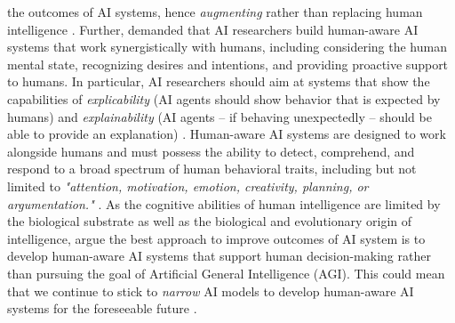 the outcomes of AI systems,  hence \textit{augmenting} rather than replacing human intelligence \citep{schmidtAugmentingHumanIntellect2017,
akataResearchAgendaHybrid2020a}. Further, \cite{kambhampatiChallengesHumanAwareAI2020} demanded that AI researchers build human-aware AI
systems that work synergistically with humans, including considering the human mental state, recognizing desires and intentions,
and providing proactive support to humans. In particular, AI researchers should aim at systems that show the capabilities of
\textit{explicability} (AI agents should show behavior that is expected by humans) and \textit{explainability} (AI agents -- 
if behaving unexpectedly -- should be able to provide an explanation) \citep{kambhampatiChallengesHumanAwareAI2020}.
Human-aware AI systems are designed to work alongside humans and must possess the ability to detect, comprehend, and respond
to a broad spectrum of human behavioral traits, including but not limited to \textit{"attention, motivation, emotion, creativity,
planning, or argumentation."} \citep{kortelingHumanArtificialIntelligence2021}. As the cognitive abilities of human intelligence
are limited by the biological substrate as well as the biological and evolutionary origin of intelligence,
\cite{kortelingHumanArtificialIntelligence2021} argue the best approach to improve outcomes of AI system is to develop
human-aware AI systems that support human decision-making rather than pursuing the goal of Artificial General Intelligence (AGI).
This could mean that we continue to stick to \textit{narrow} AI models to develop human-aware AI systems for the foreseeable
future \citep{kortelingHumanArtificialIntelligence2021}.

